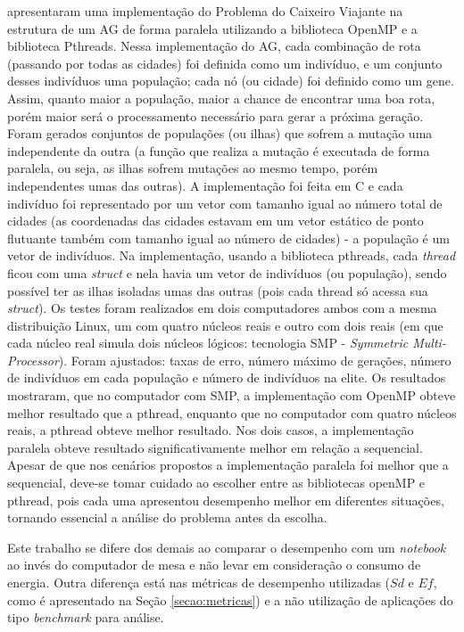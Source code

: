 \citet{silva:2012:avaliacao} apresentaram uma implementação do Problema do Caixeiro Viajante na estrutura de um AG de forma paralela utilizando a biblioteca OpenMP e a biblioteca Pthreads. Nessa implementação do AG, cada combinação de rota (passando por todas as cidades) foi definida como um indivíduo, e um conjunto desses indivíduos uma população; cada nó (ou cidade) foi definido como um gene. Assim, quanto maior a população, maior a chance de encontrar uma boa rota, porém maior será o processamento necessário para gerar a próxima geração. Foram gerados conjuntos de populações (ou ilhas) que sofrem a mutação uma independente da outra (a função que realiza a mutação é executada de forma paralela, ou seja, as ilhas sofrem mutações ao mesmo tempo, porém independentes umas das outras). A implementação foi feita em C e cada indivíduo foi representado por um vetor com tamanho igual ao número total de cidades (as coordenadas das cidades estavam em um vetor estático de ponto flutuante também com tamanho igual ao número de cidades) - a população é um vetor de indivíduos. Na implementação, usando a biblioteca pthreads, cada \textit{thread} ficou com uma \textit{struct} e nela havia um vetor de indivíduos (ou população), sendo possível ter as ilhas isoladas umas das outras (pois cada {thread} só acessa sua \textit{struct}). Os testes foram realizados em dois computadores ambos com a mesma distribuição Linux, um com quatro núcleos reais e outro com dois reais (em que cada núcleo real simula dois núcleos lógicos: tecnologia SMP - \textit{Symmetric Multi-Processor}). Foram ajustados: taxas de erro, número máximo de gerações, número de indivíduos em cada população e número de indivíduos na elite. Os resultados mostraram, que no computador com SMP, a implementação com OpenMP obteve melhor resultado que a pthread, enquanto que no computador com quatro núcleos reais, a pthread obteve melhor resultado. Nos dois casos, a implementação paralela obteve resultado significativamente melhor em relação a sequencial. Apesar de que nos cenários propostos a implementação paralela foi melhor que a sequencial, deve-se tomar cuidado ao escolher entre as bibliotecas openMP e pthread, pois cada uma apresentou desempenho melhor em diferentes situações, tornando essencial a análise do problema antes da escolha.

Este trabalho se difere dos demais ao comparar o desempenho com um \textit{notebook} ao invés do computador de mesa e não levar em consideração o consumo de energia. Outra diferença está nas métricas de desempenho utilizadas ($Sd$ e $Ef$, como é apresentado na Seção \ref{secao:metricas}) e a não utilização de aplicações do tipo \textit{benchmark} para análise.